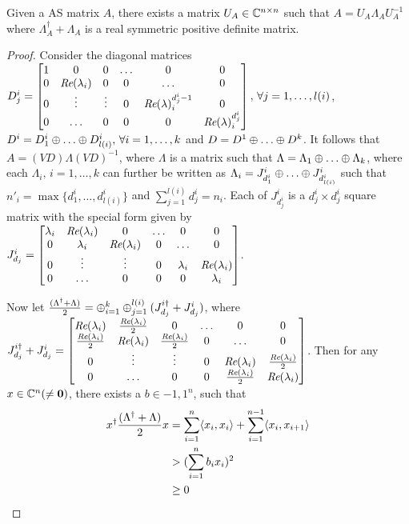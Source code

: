 \begin{lemma}
Given a AS matrix $A$, there exists a matrix $U_A\in \mathbb{C}^{n\times n}$ such that $A=U_A\Lambda_A U_A^{-1}$ where $\Lambda_A^\dag+\Lambda_A$ is a real symmetric positive definite matrix.
\end{lemma}
\begin{proof}
Consider the diagonal matrices $D^i_j=\begin{bmatrix} 1  &0 &0 &\ldots &0 &0\\ 0 &\emph{Re}(\lambda_i) &0 &0 &\ldots &0 \\ 0 &\vdots &\vdots &0 &\emph{Re}(\lambda)^{d^i_j-1}_i &0 \\ 0 &\ldots &0 &0 &0 &\emph{Re}(\lambda)^{d^i_j}_i \end{bmatrix},\,\forall j=1,\ldots,l(i)$, $D^i=D^i_1 \oplus\ldots\oplus D^i_{l(i)},\,\forall i=1,\ldots,k$ and $D=D^1 \oplus\ldots\oplus D^k$.
It follows that $A=(VD) \Lambda (VD)^{-1}$, where $\Lambda$ is a matrix such that
$\Lambda=\Lambda_1 \oplus \ldots \oplus \Lambda_k$, where each $\Lambda_i,\,i=1,\ldots,k$ can further be written as
$\Lambda_i=J^i_{d^i_1} \oplus \ldots \oplus J^i_{d^i_{l(i)}}$ such that  $n'_i=\max\{d^i_1,\ldots, d^i_{l(i)} \}$ and $\sum_{j=1}^{l(i)} d^i_j =n_i$. Each of $J^i_{d^i_j}$ is a $d^i_j\times d^i_j$ square matrix with the special form given by
$J^i_{d_j}=\begin{bmatrix} \lambda_i &\emph{Re}(\lambda_i) &0 &\ldots &0 &0\\ 0 &\lambda_i &\emph{Re}(\lambda_i) &0 &\ldots &0 \\ 0 &\vdots &\vdots &0 &\lambda_i &\emph{Re}(\lambda_i) \\ 0 &\ldots &0 &0 &0 &\lambda_i \end{bmatrix}$.

Now let $\frac{(\Lambda^\dag+\Lambda)}{2}=\oplus_{i=1}^k \oplus_{j=1}^{l(i)}(J^{i\dag}_{d_j}+J^i_{d_j})$, where $J^{i\dag}_{d_j}+J^i_{d_j}=\begin{bmatrix} \emph{Re}(\lambda_i) &\frac{\emph{Re}(\lambda_i)}{2} &0 &\ldots &0 &0\\ \frac{\emph{Re}(\lambda_i)}{2} &\emph{Re}(\lambda_i) &\frac{\emph{Re}(\lambda_i)}{2} &0 &\ldots &0 \\ 0 &\vdots &\vdots &0 &\emph{Re}(\lambda_i) &\frac{\emph{Re}(\lambda_i)}{2} \\ 0 &\ldots &0 &0 &\frac{\emph{Re}(\lambda_i)}{2} &\emph{Re}(\lambda_i) \end{bmatrix} $. Then for any $x\in \mathbb{C}^n (\neq \mathbf{0})$, there exists a $b\in {-1,1}^n$, such that
\begin{align*}
x^\dag \frac{(\Lambda^\dag+\Lambda)}{2} x &=\sum_{i=1}^n \langle x_i,x_i\rangle+\sum_{i=1}^{n-1}\langle x_i,x_{i+1}\rangle\\
&> (\sum_{i=1}^n b_i x_i)^2\\
&\geq 0
\end{align*}
\end{proof}

